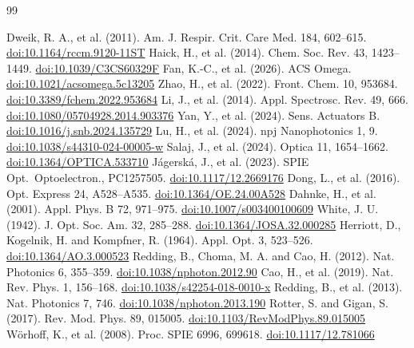 \documentclass[a4paper,12pt]{article}
\newcommand{\doilink}[1]{\href{https://doi.org/#1}{doi:#1}} %
\newcommand{\nc}[1]{\textcolor{dkleaf}{#1}} %
\begin{document}

\renewcommand\refname{References}

\begin{thebibliography}{99}
\setlength{\parskip}{-6pt}
\footnotesize

 Dweik, R. A., et al. (2011). Am. J. Respir. Crit. Care Med. 184, 602--615. \doilink{10.1164/rccm.9120-11ST}
 Haick, H., et al. (2014). Chem. Soc. Rev. 43, 1423--1449. \doilink{10.1039/C3CS60329F}
 Fan, K.-C., et al. (2026). ACS Omega. \doilink{10.1021/acsomega.5c13205}
 Zhao, H., et al. (2022). Front. Chem. 10, 953684. \doilink{10.3389/fchem.2022.953684}
 Li, J., et al. (2014). Appl. Spectrosc. Rev. 49, 666. \doilink{10.1080/05704928.2014.903376}
 Yan, Y., et al. (2024). Sens. Actuators B. \doilink{10.1016/j.snb.2024.135729}
 Lu, H., et al. (2024). npj Nanophotonics 1, 9. \doilink{10.1038/s44310-024-00005-w}
 \nc{Salaj, J., et al. (2024). Optica 11, 1654--1662. \doilink{10.1364/OPTICA.533710}}
 \nc{J\'agersk\'a, J., et al. (2023). SPIE Opt.\ Optoelectron., PC1257505. \doilink{10.1117/12.2669176}}
 \nc{Dong, L., et al. (2016). Opt. Express 24, A528--A535. \doilink{10.1364/OE.24.00A528}}
 \nc{Dahnke, H., et al. (2001). Appl. Phys. B 72, 971--975. \doilink{10.1007/s003400100609}}
 White, J. U. (1942). J. Opt. Soc. Am. 32, 285--288. \doilink{10.1364/JOSA.32.000285}
 Herriott, D., Kogelnik, H. and Kompfner, R. (1964). Appl. Opt. 3, 523--526. \doilink{10.1364/AO.3.000523}
 Redding, B., Choma, M. A. and Cao, H. (2012). Nat. Photonics 6, 355--359. \doilink{10.1038/nphoton.2012.90}
 Cao, H., et al. (2019). Nat. Rev. Phys. 1, 156--168. \doilink{10.1038/s42254-018-0010-x}
 Redding, B., et al. (2013). Nat. Photonics 7, 746. \doilink{10.1038/nphoton.2013.190}
 Rotter, S. and Gigan, S. (2017). Rev. Mod. Phys. 89, 015005. \doilink{10.1103/RevModPhys.89.015005}
 W\"orhoff, K., et al. (2008). Proc. SPIE 6996, 699618. \doilink{10.1117/12.781066}

\end{thebibliography}
\end{document}
